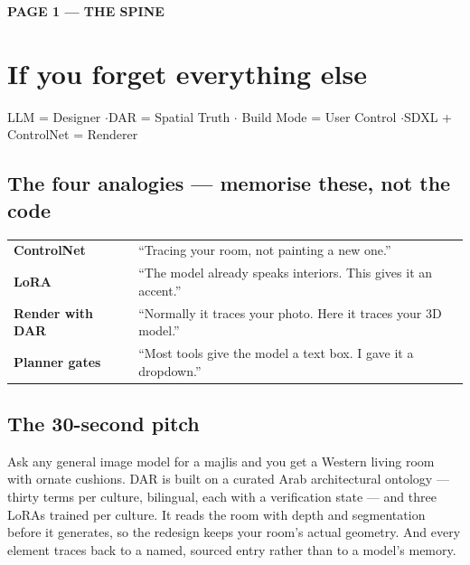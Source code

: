 \documentclass[10.5pt,a4paper]{article}
\newcommand{\pagelabel}[2]{%
  {\sffamily\bfseries\scriptsize\color{brass}\MakeUppercase{Page #1 --- #2}}\par\vspace{0.2em}}
\begin{document}
\pagelabel{1}{the spine}
\section*{If you forget everything else}

\begin{sayit}
LLM = Designer \quad$\cdot$\quad DAR = Spatial Truth \quad$\cdot$\quad
Build Mode = User Control \quad$\cdot$\quad SDXL + ControlNet = Renderer
\end{sayit}

\subsection*{The four analogies --- memorise these, not the code}
\begin{tabularx}{\linewidth}{@{}lX@{}}
\toprule
\textbf{ControlNet} & ``Tracing your room, not painting a new one.''\\
\textbf{LoRA} & ``The model already speaks interiors. This gives it an accent.''\\
\textbf{Render with DAR} & ``Normally it traces your photo. Here it traces your 3D model.''\\
\textbf{Planner gates} & ``Most tools give the model a text box. I gave it a dropdown.''\\
\bottomrule
\end{tabularx}

\subsection*{The 30-second pitch}
\begin{sayit}
Ask any general image model for a majlis and you get a Western living room with ornate cushions.
DAR is built on a curated Arab architectural ontology --- thirty terms per culture, bilingual, each
with a verification state --- and three LoRAs trained per culture. It reads the room with depth and
segmentation before it generates, so the redesign keeps your room's actual geometry. And every
element traces back to a named, sourced entry rather than to a model's memory.
\end{sayit}
\end{document}
